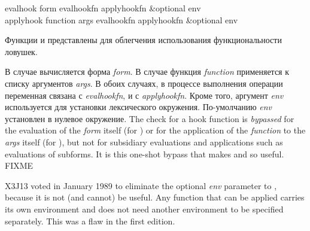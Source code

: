\begin{defun}[Функция]
evalhook form evalhookfn applyhookfn &optional env \\
applyhook function args evalhookfn applyhookfn &optional env

Функции  и  представлены для облегчения
использования функциональности ловушек.

В случае  вычисляется форма \emph{form}.
В случае  функция \emph{function} применяется к списку аргументов
\emph{args}.
В обоих случаях, в процессе выполнения операции переменная 
связана с \emph{evalhookfn}, и  с \emph{applyhookfn}.
Кроме того, аргумент \emph{env} используется для установки лексического
окружения.
По-умолчанию \emph{env} установлен в нулевое окружение.
The check for a hook function is \emph{bypassed} for the evaluation
of the \emph{form} itself (for ) or for the application
of the \emph{function} to the \emph{args} itself (for ),
but not for subsidiary evaluations and applications
such as evaluations of subforms.  It is this one-shot bypass that makes
 and  so useful. FIXME

\begin{new}
X3J13 voted in January 1989
to eliminate the optional \emph{env}
parameter to , because it is not (and cannot)
be useful.  Any function that can be applied carries its own
environment and does not need another environment to be specified
separately.
This was a flaw in the first edition.
\end{new}


\end{defun}
